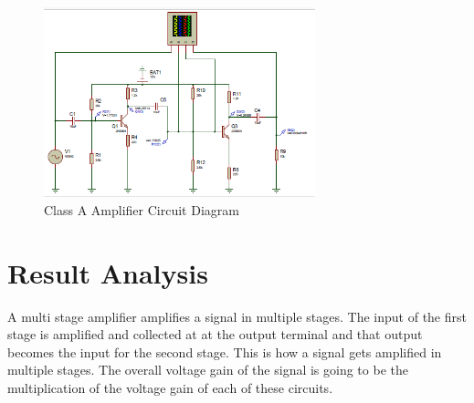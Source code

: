 \documentclass[12pt]{article}
\begin{document}
\begin{figure}[!htpb]
    \centering
    \includegraphics[width=0.7\textwidth]{Circuit Diagram.png}
    \caption{Class A Amplifier Circuit Diagram}
\end{figure}

\FloatBarrier
\section{Result Analysis}
A multi stage amplifier amplifies a signal in multiple stages. The input of the first stage is amplified and collected at at the output terminal and that output becomes the input for the second stage. This is how a signal gets amplified in multiple stages. The overall voltage gain of the signal is going to be the multiplication of the voltage gain of each of these circuits.
\end{document}
